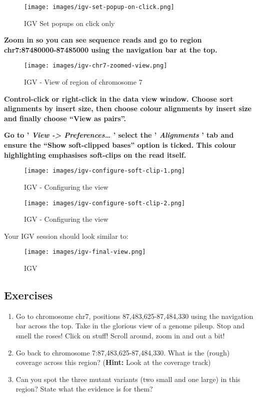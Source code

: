\documentclass[11pt]{article}
\begin{document}
    \begin{figure}
\centering
\texttt{[image: images/igv-set-popup-on-click.png]}
\caption{IGV Set popups on click only}
\end{figure}

    \textbf{Zoom in so you can see sequence reads and go to region
chr7:87480000-87485000 using the navigation bar at the top.}

    \begin{figure}
\centering
\texttt{[image: images/igv-chr7-zoomed-view.png]}
\caption{IGV - View of region of chromosome 7}
\end{figure}

    \textbf{Control-click or right-click in the data view window. Choose
sort alignments by insert size, then choose colour alignments by insert
size and finally choose ``View as pairs''.}

\textbf{Go to ' \textit{View -\textgreater{} Preferences\ldots{}} ' select
the ' \textit{Alignments} ' tab and ensure the ``Show soft-clipped bases''
option is ticked. This colour highlighting emphasises soft-clips on the
read itself.}

    \begin{figure}
\centering
\texttt{[image: images/igv-configure-soft-clip-1.png]}
\caption{IGV - Configuring the view}
\end{figure}

    \begin{figure}
\centering
\texttt{[image: images/igv-configure-soft-clip-2.png]}
\caption{IGV - Configuring the view}
\end{figure}

    Your IGV session should look similar to:

    \begin{figure}
\centering
\texttt{[image: images/igv-final-view.png]}
\caption{IGV}
\end{figure}

    \hypertarget{exercises}{%
\subsection{Exercises}\label{exercises}}

\begin{enumerate}
\def\labelenumi{\arabic{enumi}.}
\item
  Go to chromosome chr7, positions 87,483,625-87,484,330 using the
  navigation bar across the top. Take in the glorious view of a genome
  pileup. Stop and smell the roses! Click on stuff! Scroll around, zoom
  in and out a bit!
\item
  Go back to chromosome 7:87,483,625-87,484,330. What is the (rough)
  coverage across this region? (\textbf{Hint:} Look at the coverage
  track)
\item
  Can you spot the three mutant variants (two small and one large) in
  this region? State what the evidence is for them?
\end{enumerate}
\end{document}

